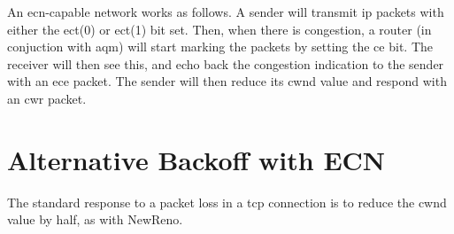 An \gls{ecn}-capable network works as follows. A sender will transmit \gls{ip} packets with either the \gls{ect}(0) or \gls{ect}(1) bit set. Then, when there is congestion, a router (in conjuction with \gls{aqm}) will start marking the packets by setting the \gls{ce} bit. The receiver will then see this, and echo back the congestion indication to the sender with an \gls{ece} packet. The sender will then reduce its \gls{cwnd} value and respond with an \gls{cwr} packet.















\section{Alternative Backoff with ECN}

The standard response to a packet loss in a \gls{tcp} connection is to reduce the \gls{cwnd} value by half, as with NewReno. 